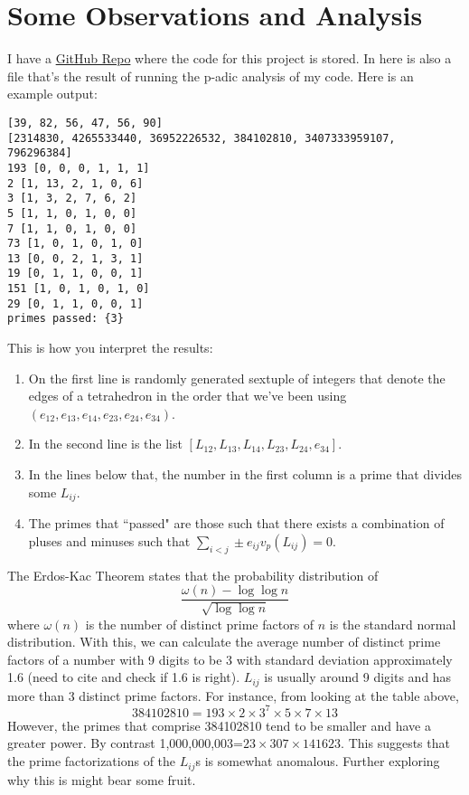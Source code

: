 \documentclass[12pt,reqno]{amsart}
\theoremstyle{definition}
\theoremstyle{remark}
\begin{document}
\section{Some Observations and Analysis}
I have a \href{https://github.com/mauriciobarba/AC-18.Tetra/tree/main}{GitHub Repo}
where the code for this project is stored. In here is also a file that's the result
of running the p-adic analysis of my code. Here is an example output:\\

\begin{verbatim}
[39, 82, 56, 47, 56, 90]
[2314830, 4265533440, 36952226532, 384102810, 3407333959107, 796296384]
193 [0, 0, 0, 1, 1, 1]
2 [1, 13, 2, 1, 0, 6]
3 [1, 3, 2, 7, 6, 2]
5 [1, 1, 0, 1, 0, 0]
7 [1, 1, 0, 1, 0, 0]
73 [1, 0, 1, 0, 1, 0]
13 [0, 0, 2, 1, 3, 1]
19 [0, 1, 1, 0, 0, 1]
151 [1, 0, 1, 0, 1, 0]
29 [0, 1, 1, 0, 0, 1]
primes passed: {3}
\end{verbatim}
This is how you interpret the results:
\begin{enumerate}
  \item On the first line is randomly generated sextuple of integers that denote the edges of a tetrahedron
  in the order that we've been using $(e_{12},e_{13},e_{14},e_{23},e_{24},e_{34})$.
  \item In the second line is the list $[L_{12},L_{13},L_{14},L_{23},L_{24},e_{34}]$.
  \item In the lines below that, the number in the first column is a prime that divides
  some $L_{ij}$. 
  \item The primes that ``passed" are those such that there exists a combination 
  of pluses and minuses such that $\sum_{i<j}\pm e_{ij}v_p(L_{ij})=0$. 
\end{enumerate}

The Erdos-Kac Theorem states that the probability distribution of 
$$
\frac{\omega(n)-\log\log n}{\sqrt{\log\log n}}
$$
where $\omega(n)$ is the number of distinct
prime factors of $n$
is the standard normal distribution. With this, we can calculate the average
number of distinct prime factors of a number with 9 digits to be 3
with standard deviation approximately 1.6 (need to cite
and check if 1.6 is right). $L_{ij}$
is usually around 9 digits and has more than 3 distinct prime factors.
For instance, from looking at the table above, 
$$
384102810=193\times 2\times 3^7\times 5\times 7\times 13
$$
However, the primes that comprise 384102810 tend to be smaller and have a 
greater power. 
By contrast 1,000,000,003=$23\times 307\times 141623$. This suggests that the 
prime factorizations of the $L_{ij}$s is somewhat anomalous. Further exploring why
this is might bear some fruit. 
\end{document}
